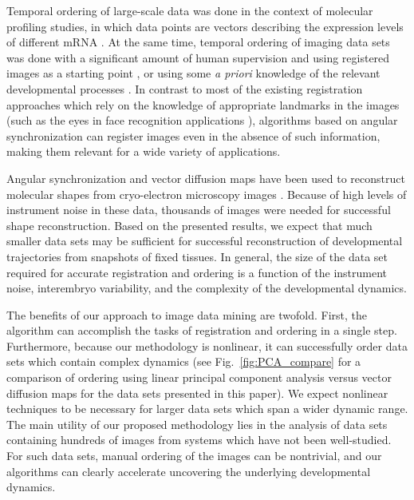 \documentclass[twocolumn, 10pt]{article}
\newcommand{\fig}[0]{Fig.}
\begin{document}
%
%
%
Temporal ordering of large-scale data was done in the context of molecular profiling studies, in which data points are vectors describing the expression levels of different mRNA \citep{anavy2014blind, trapnell2014dynamics, gupta2008extracting}.
%
At the same time, temporal ordering of imaging data sets was done with a significant amount of human supervision and using registered images as a starting point \citep{yuan2014automated, surkova2008characterization, fowlkes2008quantitative}, or using some {\em a priori} knowledge of the relevant developmental processes \citep{dubuis2013accurate}.
%
%
In contrast to most of the existing registration approaches which rely on the knowledge of appropriate landmarks in the images \citep{ian1998statistical} (such as the eyes in face recognition applications \citep{zhao2003face}), algorithms based on angular synchronization can register images even in the absence of such information, making them relevant for a wide variety of applications.
%


Angular synchronization and vector diffusion maps have been used to reconstruct molecular shapes from cryo-electron microscopy images \citep{singer2012vector, zhao2014rotationally, singer2011viewing}.
%
Because of high levels of instrument noise in these data, thousands of images were needed for successful shape reconstruction.
%
Based on the presented results, we expect that much smaller data sets may be sufficient for successful reconstruction of developmental trajectories from snapshots of fixed tissues.
%
In general, the size of the data set required for accurate registration and ordering is a function of the instrument noise, interembryo variability, and the complexity of the developmental dynamics.

%
The benefits of our approach to image data mining are twofold.
%
First, the algorithm can accomplish the tasks of registration and ordering in a single step.
%
Furthermore, because our methodology is nonlinear, it can successfully order data sets which contain complex dynamics (see \fig~\ref{fig:PCA_compare} for a comparison of ordering using linear principal component analysis versus vector diffusion maps for the data sets presented in this paper).
%
We expect nonlinear techniques to be necessary for larger data sets which span a wider dynamic range.
%
The main utility of our proposed methodology lies in the analysis of data sets containing hundreds of images from systems which have not been well-studied.
%
For such data sets, manual ordering of the images can be nontrivial, and our algorithms can clearly accelerate uncovering the underlying developmental dynamics.
\end{document}
